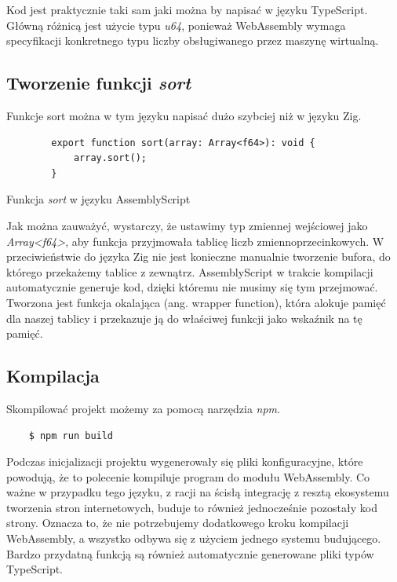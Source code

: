 \documentclass[language=polish,type=master]{aghmodern}
\begin{document}
Kod jest praktycznie taki sam jaki można by napisać w języku TypeScript.
Główną różnicą jest użycie typu \emph{u64}, ponieważ WebAssembly wymaga specyfikacji konkretnego typu liczby obsługiwanego przez maszynę wirtualną.

\subsection{Tworzenie funkcji \emph{sort}}

Funkcje sort można w tym języku napisać dużo szybciej niż w języku Zig.

\begin{listing}[H]
    \begin{verbatim}
        export function sort(array: Array<f64>): void {
            array.sort();
        }
    \end{verbatim}
    \caption{Funkcja \emph{sort} w języku AssemblyScript}
\end{listing}

Jak można zauważyć, wystarczy, że ustawimy typ zmiennej wejściowej jako \emph{Array<f64>}, aby funkcja przyjmowała tablicę liczb zmiennoprzecinkowych.
W przeciwieństwie do języka Zig nie jest konieczne manualnie tworzenie bufora, do którego przekażemy tablice z zewnątrz.
AssemblyScript w trakcie kompilacji automatycznie generuje kod, dzięki któremu nie musimy się tym przejmować.
Tworzona jest funkcja okalająca (ang. wrapper function), która alokuje pamięć dla naszej tablicy i przekazuje ją do właściwej funkcji jako wskaźnik na tę pamięć.

\subsection{Kompilacja}
Skompilować projekt możemy za pomocą narzędzia \emph{npm}.

\begin{verbatim}
    $ npm run build
\end{verbatim}

Podczas inicjalizacji projektu wygenerowały się pliki konfiguracyjne, które powodują, że to polecenie kompiluje program do modułu WebAssembly.
Co ważne w przypadku tego języku, z racji na ścisłą integrację z resztą ekosystemu tworzenia stron internetowych, buduje to również jednocześnie pozostały kod strony.
Oznacza to, że nie potrzebujemy dodatkowego kroku kompilacji WebAssembly, a wszystko odbywa się z użyciem jednego systemu budującego.
Bardzo przydatną funkcją są również automatycznie generowane pliki typów TypeScript.
\end{document}
